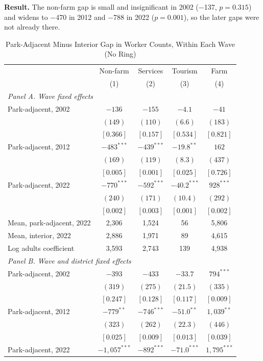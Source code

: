 \documentclass[11pt]{article}
\begin{document}
\textbf{Result.} The non-farm gap is small and insignificant in 2002 ($-$137, $p=0.315$) and widens to $-$470 in 2012 and $-$788 in 2022 ($p=0.001$), so the later gaps were not already there.
\clearpage
\begin{table}[H]
\centering\small\setlength{\tabcolsep}{4pt}
\caption{Park-Adjacent Minus Interior Gap in Worker Counts, Within Each Wave (No Ring)}
\label{tab:levelsgap_nr}
\begin{tabular}{lcccc}
\toprule
 & Non-farm & Services & Tourism & Farm \\
 & (1) & (2) & (3) & (4) \\
\midrule
\multicolumn{5}{l}{\textit{Panel A. Wave fixed effects}} \\
Park-adjacent, 2002 & $-136$ & $-155$ & $-4.1$ & $-41$ \\
 & $(149)$ & $(110)$ & $(6.6)$ & $(183)$ \\
 & $[0.366]$ & $[0.157]$ & $[0.534]$ & $[0.821]$ \\
Park-adjacent, 2012 & $-483^{***}$ & $-439^{***}$ & $-19.8^{**}$ & $162$ \\
 & $(169)$ & $(119)$ & $(8.3)$ & $(437)$ \\
 & $[0.005]$ & $[0.001]$ & $[0.025]$ & $[0.726]$ \\
Park-adjacent, 2022 & $-770^{***}$ & $-592^{***}$ & $-40.2^{***}$ & $928^{***}$ \\
 & $(240)$ & $(171)$ & $(10.4)$ & $(292)$ \\
 & $[0.002]$ & $[0.003]$ & $[0.001]$ & $[0.002]$ \\
Mean, park-adjacent, 2022 & 2,306 & 1,524 & 56 & 5,806 \\
Mean, interior, 2022 & 2,886 & 1,971 & 89 & 4,615 \\
Log adults coefficient & 3,593 & 2,743 & 139 & 4,938 \\
\multicolumn{5}{l}{\textit{Panel B. Wave and district fixed effects}} \\
Park-adjacent, 2002 & $-393$ & $-433$ & $-33.7$ & $794^{***}$ \\
 & $(319)$ & $(275)$ & $(21.5)$ & $(335)$ \\
 & $[0.247]$ & $[0.128]$ & $[0.117]$ & $[0.009]$ \\
Park-adjacent, 2012 & $-779^{**}$ & $-746^{***}$ & $-51.0^{**}$ & $1,039^{**}$ \\
 & $(323)$ & $(262)$ & $(22.3)$ & $(446)$ \\
 & $[0.025]$ & $[0.009]$ & $[0.013]$ & $[0.039]$ \\
Park-adjacent, 2022 & $-1,057^{***}$ & $-892^{***}$ & $-71.0^{***}$ & $1,795^{***}$ \\

\end{tabular}
\end{table}
\end{document}
